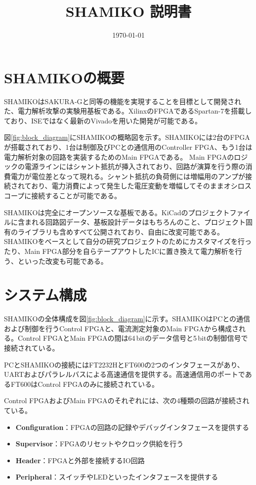 \documentclass[dvipdfmx]{jlreq}
\title{SHAMIKO 説明書}
\author{}
\date{\today}
\begin{document}
\maketitle

\tableofcontents
\clearpage

\section{SHAMIKOの概要}
SHAMIKOはSAKURA-Gと同等の機能を実現することを目標として開発された、電力解析攻撃の実験用基板である。XilinxのFPGAであるSpartan-7を搭載しており、ISEではなく最新のVivadoを用いた開発が可能である。

図\ref{fig:block_diagram}にSHAMIKOの概略図を示す。SHAMIKOには2台のFPGAが搭載されており、1台は制御及びPCとの通信用のController FPGA、もう1台は電力解析対象の回路を実装するためのMain FPGAである。
Main FPGAのロジックの電源ラインにはシャント抵抗が挿入されており、回路が演算を行う際の消費電力が電位差となって現れる。シャント抵抗の負荷側には増幅用のアンプが接続されており、電力消費によって発生した電圧変動を増幅してそのままオシロスコープに接続することが可能である。

SHAMIKOは完全にオープンソースな基板である。KiCadのプロジェクトファイルに含まれる回路図データ、基板設計データはもちろんのこと、プロジェクト固有のライブラリも含めすべて公開されており、自由に改変可能である。
SHAMIKOをベースとして自分の研究プロジェクトのためにカスタマイズを行ったり、Main FPGA部分を自らテープアウトしたICに置き換えて電力解析を行う、といった改変も可能である。

\section{システム構成}
SHAMIKOの全体構成を図\ref{fig:block_diagram}に示す。SHAMIKOはPCとの通信および制御を行うControl FPGAと、電流測定対象のMain FPGAから構成される。Control FPGAとMain FPGAの間は64\,bitのデータ信号と5\,bitの制御信号で接続されている。

PCとSHAMIKOの接続にはFT2232HとFT600の2つのインタフェースがあり、UARTおよびパラレルバスによる高速通信を提供する。高速通信用のポートであるFT600はControl FPGAのみに接続されている。

Control FPGAおよびMain FPGAのそれぞれには、次の4種類の回路が接続されている。
\begin{itemize}
  \item \textbf{Configuration}：FPGAの回路の記録やデバッグインタフェースを提供する
  \item \textbf{Supervisor}：FPGAのリセットやクロック供給を行う
  \item \textbf{Header}：FPGAと外部を接続するIO回路
  \item \textbf{Peripheral}：スイッチやLEDといったインタフェースを提供する
\end{itemize}
\end{document}
